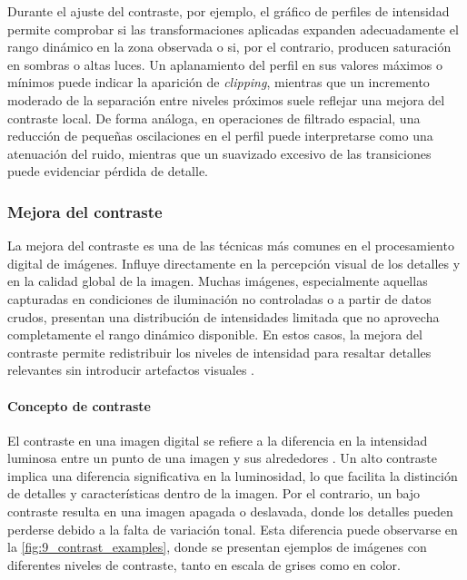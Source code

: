 Durante el ajuste del contraste, por ejemplo, el gráfico de perfiles de intensidad permite comprobar si las transformaciones aplicadas expanden adecuadamente el rango dinámico 
en la zona observada o si, por el contrario, producen saturación en sombras o altas luces. Un aplanamiento del perfil en sus valores máximos o mínimos 
puede indicar la aparición de \textit{clipping}, mientras que un incremento moderado de la separación entre niveles próximos suele reflejar una mejora 
del contraste local. De forma análoga, en operaciones de filtrado espacial, una reducción de pequeñas oscilaciones en el perfil puede interpretarse 
como una atenuación del ruido, mientras que un suavizado excesivo de las transiciones puede evidenciar pérdida de detalle.

\newpage

\subsubsection{Mejora del contraste} \label{subsec:3_5_3_mejora_contraste}
La mejora del contraste es una de las técnicas más comunes en el procesamiento digital de imágenes.
Influye directamente en la percepción visual de los detalles y en la calidad global de la imagen.
Muchas imágenes, especialmente aquellas capturadas en condiciones de iluminación no controladas
o a partir de datos crudos, presentan una distribución de intensidades limitada que no aprovecha 
completamente el rango dinámico disponible. En estos casos, la mejora del contraste permite 
redistribuir los niveles de intensidad para resaltar detalles relevantes sin introducir 
artefactos visuales \cite{visual_artifacts}.

\paragraph{Concepto de contraste} \label{subsubsec:3_5_3_1_concepto_contraste}
El contraste en una imagen digital se refiere a la diferencia en la intensidad luminosa entre un punto de una imagen
y sus alrededores \cite{contrast}. 
Un alto contraste implica una diferencia significativa en la luminosidad, lo que facilita la distinción
de detalles y características dentro de la imagen. Por el contrario, un bajo contraste resulta en una
imagen apagada o deslavada, donde los detalles pueden perderse debido a la falta de variación tonal. Esta 
diferencia puede observarse en la \autoref{fig:9_contrast_examples}, donde se presentan ejemplos de imágenes 
con diferentes niveles de contraste, tanto en escala de grises como en color.

